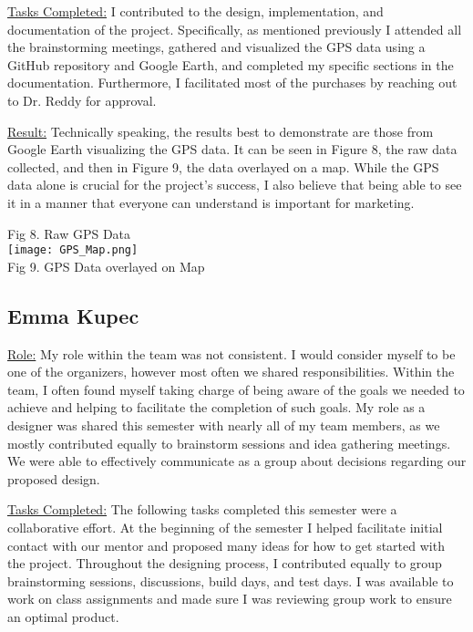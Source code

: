 \underline{Tasks Completed:} I contributed to the design, implementation, and documentation of the project. 
Specifically, as mentioned previously I attended all the brainstorming meetings, gathered and visualized the GPS data using a GitHub repository and Google Earth, and completed my specific sections in the documentation. 
Furthermore, I facilitated most of the purchases by reaching out to Dr. Reddy for approval.

\underline{Result:} Technically speaking, the results best to demonstrate are those from Google Earth visualizing the GPS data. 
It can be seen in Figure 8, the raw data collected, and then in Figure 9, the data overlayed on a map. 
While the GPS data alone is crucial for the project's success, I also believe that being able to see it in a manner that everyone can understand is important for marketing.

\begin{center}
    Fig 8. Raw GPS Data\\
    \texttt{[image: GPS\_Map.png]}\\
    Fig 9. GPS Data overlayed on Map
\end{center}

\subsection{Emma Kupec}
\underline{Role:} My role within the team was not consistent. 
I would consider myself to be one of the organizers, however most often we shared responsibilities. 
Within the team, I often found myself taking charge of being aware of the goals we needed to achieve and helping to facilitate the completion of such goals. 
My role as a designer was shared this semester with nearly all of my team members, as we mostly contributed equally to brainstorm sessions and idea gathering meetings. We were able to effectively communicate as a group about decisions regarding our proposed design.

\underline{Tasks Completed:} The following tasks completed this semester were a collaborative effort. 
At the beginning of the semester I helped facilitate initial contact with our mentor and proposed many ideas for how to get started with the project. 
Throughout the designing process, I contributed equally to group brainstorming sessions, discussions, build days, and test days. 
I was available to work on class assignments and made sure I was reviewing group work to ensure an optimal product.

